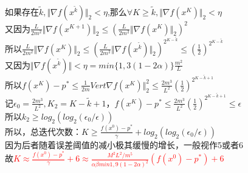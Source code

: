 \documentclass{article}
\begin{document}
如果存在$\tilde{k}, \Vert  \nabla f(x^{\tilde{k}}) \Vert_2 < \eta$,那么$\forall K \geq \tilde{k},\Vert  \nabla f(x^K) \Vert_2 < \eta$\\
又因为$\frac{L}{2m^2}\Vert  \nabla f(x^{K+1}) \Vert_2 \leq (\frac{L}{2m^2}\Vert  \nabla f(x^K) \Vert_2)^2$\\
所以$\frac{L}{2m^2}\Vert  \nabla f(x^{K}) \Vert_2 \leq (\frac{L}{2m^2}\Vert  \nabla f(x^{\tilde{k}}) \Vert_2)^{2^{K - \tilde{k}}}\leq (\frac{1}{2})^{2^{K-\tilde{k}}}$\\
又因为$\Vert  \nabla f(x^{\tilde{k}}) \Vert < \eta = min\{1,3(1-2\alpha)\}\frac{m^2}{L}$\\
所以$f(x^K) - p^* \leq \frac{1}{2m} Vert  \nabla f(x^K) \Vert_2^2 \leq \frac{2m^3}{L^2}(\frac{1}{2})^{2^{K-\tilde{k} + 1}}$\\
记$\epsilon_0 = \frac{2m^3}{L^2}, K_2 = K-\tilde{k} + 1$，$f(x^K) - p^* \leq \frac{2m^3}{L^2}(\frac{1}{2})^{2^{K-\tilde{k} + 1}} \leq \epsilon$\\
所以$k_2 \geq log_2(log_2(\epsilon_0 / \epsilon))$\\
所以，总迭代次数：$K \geq \frac{f(x^0) - p^*}{\gamma} + log_2(log_2(\epsilon_0 / \epsilon))$\\
因为后者随着误差阈值的减小极其缓慢的增长，一般视作5或者6\\
故\textcolor{red}{$K \approx \frac{f(x^0) - p^*}{\gamma} + 6 \approx \frac{M^2L^2/m^5}{\alpha \beta min{1,9(1-2\alpha)^2}} (f(x^0) - p^*) + 6$}\\
\end{document}
